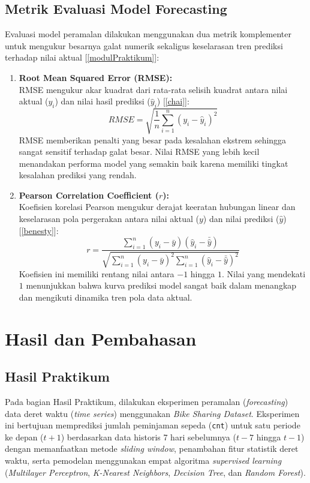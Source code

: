 \documentclass[a4paper,oneside,11pt]{book}
\begin{document}
\section{Metrik Evaluasi Model Forecasting}
Evaluasi model peramalan dilakukan menggunakan dua metrik komplementer untuk mengukur besarnya galat numerik sekaligus keselarasan tren prediksi terhadap nilai aktual [\ref{modulPraktikum}]:
\begin{enumerate}
    \item \textbf{Root Mean Squared Error (RMSE):}\\
    RMSE mengukur akar kuadrat dari rata-rata selisih kuadrat antara nilai aktual ($y_{i}$) dan nilai hasil prediksi ($\hat{y}_{i}$) [\ref{chai}]:
    \begin{equation}
        RMSE = \sqrt{\frac{1}{n}\sum_{i=1}^{n}\left(y_{i} - \hat{y}_{i}\right)^2}
    \end{equation}
    RMSE memberikan penalti yang besar pada kesalahan ekstrem sehingga sangat sensitif terhadap galat besar. Nilai RMSE yang lebih kecil menandakan performa model yang semakin baik karena memiliki tingkat kesalahan prediksi yang rendah.

    \item \textbf{Pearson Correlation Coefficient ($r$):}\\
    Koefisien korelasi Pearson mengukur derajat keeratan hubungan linear dan keselarasan pola pergerakan antara nilai aktual ($y$) dan nilai prediksi ($\hat{y}$) [\ref{benesty}]:
    \begin{equation}
        r = \frac{\sum_{i=1}^{n}(y_{i} - \bar{y})(\hat{y}_{i} - \bar{\hat{y}})}{\sqrt{\sum_{i=1}^{n}(y_{i} - \bar{y})^2 \sum_{i=1}^{n}(\hat{y}_{i} - \bar{\hat{y}})^2}}
    \end{equation}
    Koefisien ini memiliki rentang nilai antara $-1$ hingga $1$. Nilai yang mendekati $1$ menunjukkan bahwa kurva prediksi model sangat baik dalam menangkap dan mengikuti dinamika tren pola data aktual.
\end{enumerate}

\chapter{Hasil dan Pembahasan}

\section{Hasil Praktikum}
Pada bagian Hasil Praktikum, dilakukan eksperimen peramalan (\textit{forecasting}) data deret waktu (\textit{time series}) menggunakan \textit{Bike Sharing Dataset}. Eksperimen ini bertujuan memprediksi jumlah peminjaman sepeda (\texttt{cnt}) untuk satu periode ke depan ($t+1$) berdasarkan data historis 7 hari sebelumnya ($t-7$ hingga $t-1$) dengan memanfaatkan metode \textit{sliding window}, penambahan fitur statistik deret waktu, serta pemodelan menggunakan empat algoritma \textit{supervised learning} (\textit{Multilayer Perceptron}, \textit{K-Nearest Neighbors}, \textit{Decision Tree}, dan \textit{Random Forest}).
\end{document}
